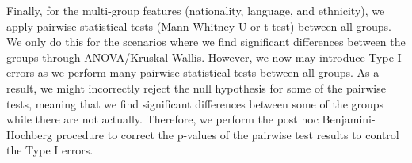 %
Finally, for the multi-group features (nationality, language, and ethnicity), we apply pairwise statistical tests (Mann-Whitney U or t-test) between all groups.
%
We only do this for the scenarios where we find significant differences between the groups through ANOVA/Kruskal-Wallis.
%
However, we now may introduce Type I errors as we perform many pairwise statistical tests between all groups.
%
As a result, we might incorrectly reject the null hypothesis for some of the pairwise tests, meaning that we find significant differences between some of the groups while there are not actually.
%
Therefore, we perform the post hoc Benjamini-Hochberg procedure to correct the p-values of the pairwise test results to control the Type I errors.